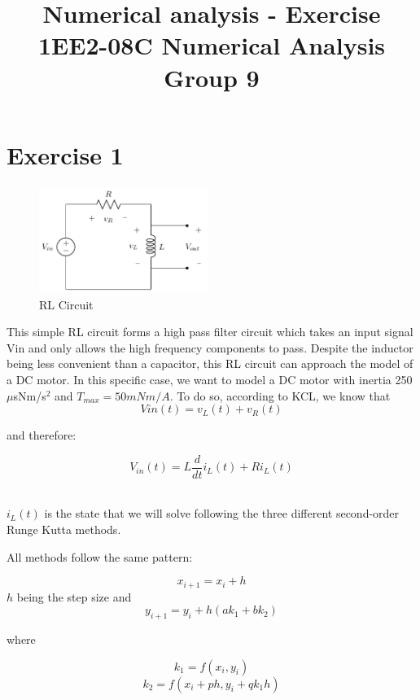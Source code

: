 \documentclass[10pt,a4paper]{article}
\title{Numerical analysis - Exercise 1}
\author{}
\date{}
\begin{document}
\vspace{-20mm}
\title{\textbf{EE2-08C Numerical Analysis} \\ Group 9\vspace{-17mm}}
\maketitle

\section*{Exercise 1}\vspace{-1mm}
    
\begin{figure}
\vspace{-10mm}
\includegraphics[width=0.49\textwidth]{RL_circuit.png}
\vspace{-6mm}
\caption{RL Circuit}
\label{fig:RL}
\end{figure}

This simple RL circuit forms a high pass filter circuit which takes an input signal Vin and only allows the high frequency components to pass. Despite the inductor being less convenient than a capacitor, this RL circuit can approach the model of a DC motor. In this specific case, we want to model a DC motor with inertia 250 $\mu$sNm/s$^2$ and $T_{max} = 50mNm/A$. To do so, according to KCL, we know that 
\[Vin(t) = v_L(t) + v_R(t)\] 

and therefore: 

\[ V_{in}(t) = L\frac{d}{dt}i_L(t) + R i_L(t) \]

\\ $i_L(t)$ is the state that we will solve following the three different second-order Runge Kutta methods.

All methods follow the same pattern:

\[x_{i+1} = x_i + h\] 
$h$ being the step size and 
\[y_{i+1} = y_i + h (a k_1 + b k_2)\]

where

\[k_1 = f(x_i, y_i)\]
\[k_2 = f(x_i + p h, y_i + q k_1 h)\]
\end{document}
